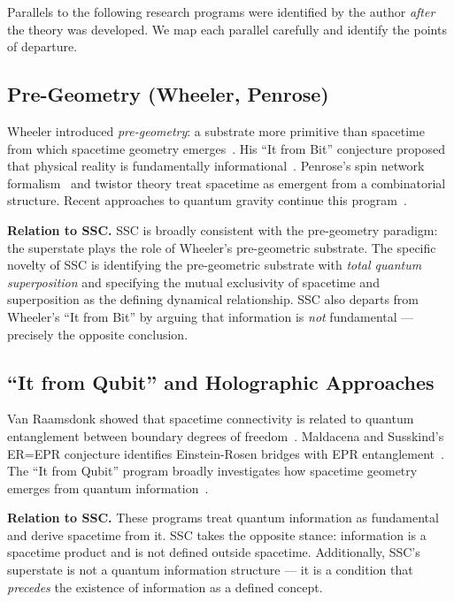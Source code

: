 \documentclass[12pt,a4paper]{article}
\begin{document}
Parallels to the following research programs were identified by the
author \emph{after} the theory was developed.  We map each parallel
carefully and identify the points of departure.

\subsection{Pre-Geometry (Wheeler, Penrose)}

Wheeler introduced \emph{pre-geometry}: a substrate more primitive than
spacetime from which spacetime geometry emerges~\citep{wheeler1968}.
His ``It from Bit'' conjecture proposed that physical reality is
fundamentally informational~\citep{wheeler1990}.  Penrose's spin
network formalism~\citep{penrose1971} and twistor theory treat
spacetime as emergent from a combinatorial structure.  Recent
approaches to quantum gravity continue this program~\citep{oriti2009}.

\textbf{Relation to SSC.}  SSC is broadly consistent with the
pre-geometry paradigm: the superstate plays the role of Wheeler's
pre-geometric substrate.  The specific novelty of SSC is identifying
the pre-geometric substrate with \emph{total quantum superposition} and
specifying the mutual exclusivity of spacetime and superposition as the
defining dynamical relationship.  SSC also departs from Wheeler's ``It
from Bit'' by arguing that information is \emph{not} fundamental —
precisely the opposite conclusion.

\subsection{``It from Qubit'' and Holographic Approaches}

Van Raamsdonk showed that spacetime connectivity is related to quantum
entanglement between boundary degrees of
freedom~\citep{vanraamsdonk2010}.  Maldacena and Susskind's ER=EPR
conjecture identifies Einstein-Rosen bridges with EPR
entanglement~\citep{maldacena2013}.  The ``It from Qubit'' program
broadly investigates how spacetime geometry emerges from quantum
information~\citep{preskill2017}.

\textbf{Relation to SSC.}  These programs treat quantum information as
fundamental and derive spacetime from it.  SSC takes the opposite
stance: information is a spacetime product and is not defined outside
spacetime.  Additionally, SSC's superstate is not a quantum information
structure — it is a condition that \emph{precedes} the existence of
information as a defined concept.
\end{document}
